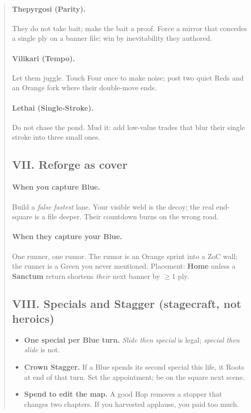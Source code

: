 \documentclass[11pt]{article}
\begin{document}
\begin{quote}
\paragraph{Thepyrgosi (Parity).} They do not take bait; make the bait a proof. Force a mirror that concedes a single ply on a banner file; win by inevitability they authored.
\paragraph{Vilikari (Tempo).} Let them juggle. Touch Four once to make noise; post two quiet Reds and an Orange fork where their double-move ends.
\paragraph{Lethai (Single-Stroke).} Do not chase the pond. Mud it: add low-value trades that blur their single stroke into three small ones.

\subsection{VII. Reforge as cover}
\paragraph{When you capture Blue.} Build a \emph{false fastest} lane. Your visible weld is the decoy; the real end-square is a file deeper. Their countdown burns on the wrong road.
\paragraph{When they capture your Blue.} One runner, one rumor. The rumor is an Orange sprint into a ZoC wall; the runner is a Green you never mentioned. Placement: \textbf{Home} unless a \textbf{Sanctum} return shortens \emph{their} next banner by $\ge 1$ ply.

\subsection{VIII. Specials and Stagger (stagecraft, not heroics)}
\begin{itemize}\itemsep=0.2em
  \item \textbf{One special per Blue turn.} \emph{Slide then special} is legal; \emph{special then slide} is not.
  \item \textbf{Crown Stagger.} If a Blue spends its second special this life, it Roots at end of that turn. Set the appointment; be on the square next scene.
  \item \textbf{Spend to edit the map.} A good Hop removes a stopper that changes two chapters. If you harvested applause, you paid too much.
\end{itemize}


\end{quote}
\end{document}
